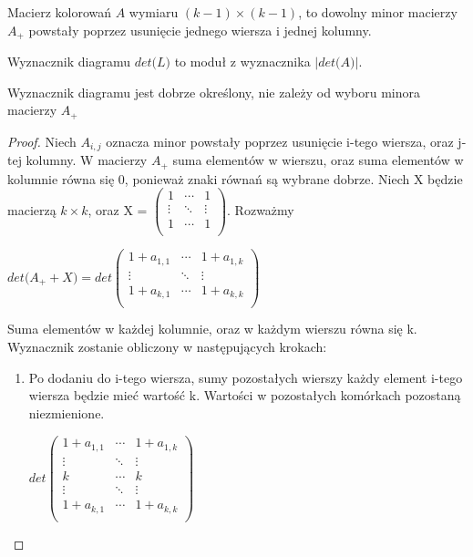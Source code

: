   \begin{definicja}
	Macierz kolorowań $A$ wymiaru $(k-1) \times (k-1)$, to dowolny minor macierzy $A_{+}$ powstały poprzez usunięcie jednego wiersza i jednej kolumny.
  \end{definicja}
    \begin{definicja}
    Wyznacznik diagramu $ det \big(L\big)$ to moduł z wyznacznika $\vert det \big(A\big) \vert$.
    \end{definicja}
    
\begin{twierdzenie}
Wyznacznik diagramu jest dobrze określony, nie zależy od wyboru minora macierzy $A_{+}$
\end{twierdzenie}

\begin{proof}
Niech $A_{i,j}$ oznacza minor powstały poprzez usunięcie i-tego wiersza, oraz j-tej kolumny. W macierzy $A_{+}$ suma elementów w wierszu, oraz suma elementów w kolumnie równa się 0, ponieważ znaki równań są wybrane dobrze. Niech X będzie macierzą $k \times k$, oraz X = 
$
\begin{pmatrix}
 1 & \cdots & 1 \\
 \vdots & \ddots & \vdots \\
 1 & \cdots & 1 \\
\end{pmatrix}
$. Rozważmy \\
\begin{center}
 $det\big( A_{+}+X \big)=det \begin{pmatrix}
 1+a_{1,1} & \cdots & 1+a_{1,k} \\
 \vdots & \ddots & \vdots \\
 1+a_{k,1} & \cdots & 1+a_{k,k} \\
\end{pmatrix}$ \\
\end{center} 
Suma elementów w każdej kolumnie, oraz w każdym wierszu równa się k. Wyznacznik zostanie obliczony w następujących krokach:
\begin{enumerate}
\item Po dodaniu do  i-tego wiersza, sumy pozostałych wierszy każdy element i-tego wiersza będzie mieć wartość k. Wartości w pozostałych komórkach pozostaną niezmienione. \\
\begin{center}

$det \begin{pmatrix}
 1+a_{1,1} & \cdots &  1+a_{1,k} \\
 \vdots & \ddots & \vdots \\
  k & \cdots &  k \\ 
 \vdots & \ddots & \vdots \\
 1+a_{k,1} & \cdots & 1+a_{k,k} \\
\end{pmatrix}$ \\
\end{center}


\end{enumerate}
\end{proof}
